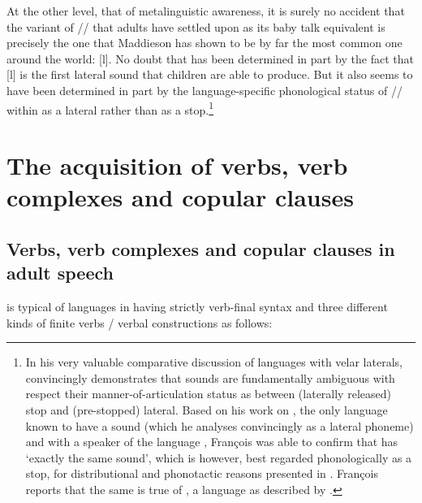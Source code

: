 \documentclass[output=paper]{langsci/langscibook}
\begin{document}
 At the other level, that of metalinguistic awareness, it is surely no accident that the variant of /{\gL}/ that adults have settled upon as its baby talk equivalent is precisely the one that Maddieson has shown to be by far the most common one around the world: [l]. No doubt that has been determined in part by the fact that [l] is the first lateral sound that  children are able to produce. But it also seems to have been determined in part by the language-specific phonological status of /{\gL}/ within  as a lateral rather than as a stop.\footnote{In his very valuable comparative discussion of languages with velar laterals, \citet{François2010} convincingly demonstrates that {\gL} sounds are fundamentally ambiguous with respect their manner-of-articulation status as between (laterally released) stop and (pre-stopped) lateral. Based on his work on , the only  language known to have a {\gL} sound (which he analyses convincingly as a lateral phoneme) and with a speaker of the  language , François was able to confirm that  has ‘exactly the same sound’, which is however, best regarded phonologically as a stop, for distributional and phonotactic reasons presented in \citet{Doble1987}. François reports that the same is true of , a  language as described by \citet{Edmondson1999}.}

\section{The acquisition of  verbs, verb complexes and copular clauses}\label{sec:rumsey:2}
\subsection{Verbs, verb complexes and copular clauses in  adult speech}

 is typical of  languages in having strictly verb-final syntax and three different kinds of finite verbs / verbal constructions as follows:
\end{document}

